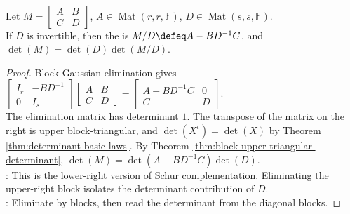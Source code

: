 \begin{proposition} \label{prop:schur-complement-lower-right-determinant} \\
Let $M=
\begin{bmatrix}
A & B\\
C & D
\end{bmatrix}$, $A\in\operatorname{Mat}(r,r,\mathbb{F})$, $D\in\operatorname{Mat}(s,s,\mathbb{F})$.\\
If $D$ is invertible, then the  is $M/D\defeq A-BD^{-1}C$, and $\det(M)=\det(D)\det(M/D)$.
\begin{proof}
Block Gaussian elimination gives $\begin{bmatrix}
I_r & -BD^{-1}\\
0 & I_s
\end{bmatrix}
\begin{bmatrix}
A & B\\
C & D
\end{bmatrix}
=
\begin{bmatrix}
A-BD^{-1}C & 0\\
C & D
\end{bmatrix}$.\\
The elimination matrix has determinant $1$. The transpose of the matrix on the right is upper block-triangular, and $\det(X^t)=\det(X)$ by Theorem \ref{thm:determinant-basic-laws}. By Theorem \ref{thm:block-upper-triangular-determinant}, $\det(M)=\det(A-BD^{-1}C)\det(D)$.\\
: This is the lower-right version of Schur complementation. Eliminating the upper-right block isolates the determinant contribution of $D$.\\
: Eliminate by blocks, then read the determinant from the diagonal blocks.
\end{proof}
\end{proposition}

